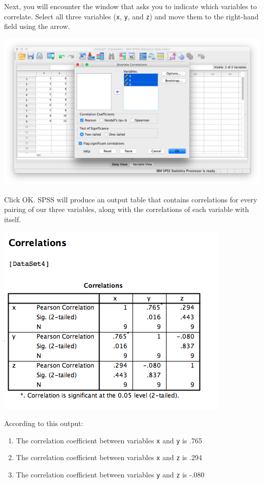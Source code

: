 \documentclass[
]{book}
\providecommand{\tightlist}{%
  \setlength{\itemsep}{0pt}\setlength{\parskip}{0pt}}
\begin{document}
Next, you will encounter the window that asks you to indicate which variables to correlate. Select all three variables (\texttt{x}, \texttt{y}, and \texttt{z}) and move them to the right-hand field using the arrow.

\includegraphics{img/3.4.17.png}

Click {OK}. SPSS will produce an output table that contains correlations for every pairing of our three variables, along with the correlations of each variable with itself.

\includegraphics{img/3.4.18.png}

According to this output:

\begin{enumerate}
\def\labelenumi{\arabic{enumi}.}
\tightlist
\item
  The correlation coefficient between variables \texttt{x} and \texttt{y} is .765
\item
  The correlation coefficient between variables \texttt{x} and \texttt{z} is .294
\item
  The correlation coefficient between variables \texttt{y} and \texttt{z} is -.080
\end{enumerate}
\end{document}

